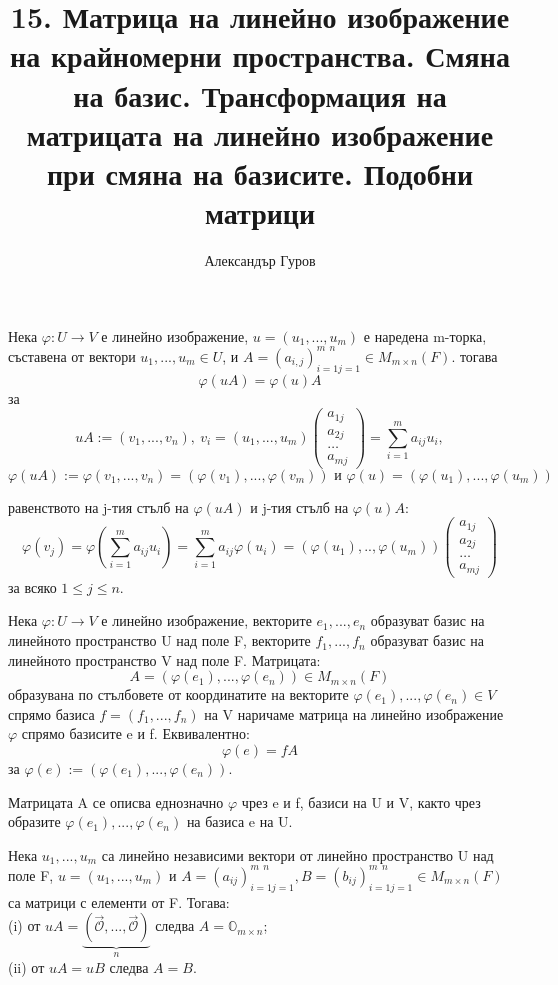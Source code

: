 \documentclass{article}
\title{15. Матрица на линейно изображение на крайномерни пространства. Смяна на базис. 
Трансформация на матрицата на линейно изображение при смяна на базисите. Подобни матрици}
\author{Александър Гуров}
\date{\datebulgarian{\today}}
\newcommand*{\nullvec}{\vec{\mathcal{O}}}
\newcommand{\dok}{\underline{Доказателство}\  }
\newcommand{\tvurdenie}[2]{
    \begin{tcolorbox}[title = #1 ,colframe = blue!70!black, colback = blue!10!white]
        #2
    \end{tcolorbox}
}
\newcommand{\opredelenie}[2]{
    \begin{tcolorbox}[title = #1 ,colframe = red!70!black, colback = red!10!white]
        #2
    \end{tcolorbox}
}
\begin{document}
\maketitle

\tvurdenie{Лема 15.2 (\emph{Матричен запис на линейно изображение})}{
Нека $\varphi : U \rightarrow V$ е линейно изображение, $u=(u_1,...,u_m)$ е наредена m-торка, съставена от вектори $u_1,...,u_m\in U$, и
$A=(a_{i,j})_{i=1j=1}^{m \ \ n} \in M_{m\times n}(F)$. тогава
\[
    \varphi(uA)=\varphi(u)A
\]
за
\[
    uA:=(v_1,...,v_n), \ v_i=(u_1,...,u_m)\left(\begin{array}{c}
            a_{1j} \\
            a_{2j} \\
            \dots  \\
            a_{mj}
        \end{array}\right)=\sum_{i=1}^{m}a_{ij}u_i,
\]
\[
    \varphi(uA):=\varphi(v_1,...,v_n)=(\varphi(v_1),...,\varphi(v_m)) \text{ и } \varphi(u)=(\varphi(u_1),...,\varphi(u_m))
\]
}
 равенството на j-тия стълб на $\varphi(uA)$ и j-тия стълб на $\varphi(u)A$:
\[
    \varphi(v_j)=\varphi\left(\sum_{i=1}^{m}a_{ij}u_i\right)=\sum_{i=1}^{m}a_{ij}\varphi(u_i)=(\varphi(u_1),..,\varphi(u_m))\left(\begin{array}{c}
            a_{1j} \\
            a_{2j} \\
            \dots  \\
            a_{mj}
        \end{array}\right)
\]
за всяко $1\leq j\leq n$.
\opredelenie{Определение 15.2}{
Нека $\varphi: U\rightarrow V$ е линейно изображение, векторите $e_1,...,e_n$ образуват базис на
линейното пространство U над поле F, векторите $f_1,...,f_n$ образуват базис на линейното
пространство V над поле F. Матрицата:
\[
    A=(\varphi(e_1),...,\varphi(e_n))\in M_{m\times n}(F)
\]
образувана по стълбовете от координатите на векторите $\varphi(e_1),...,\varphi(e_n)\in V$ спрямо базиса $f=(f_1,...,f_n)$ на V
наричаме матрица на линейно изображение $\varphi$ спрямо базисите e и f. Еквивалентно:
\[
    \varphi(e)=fA
\]
за $\varphi(e):=(\varphi(e_1),...,\varphi(e_n) )$.
}

Матрицата A се описва еднозначно $\varphi$ чрез e и f, базиси на U и V, както чрез образите $\varphi(e_1),...,\varphi(e_n)$ на базиса e на U.

\tvurdenie{Лема 15.4  (\emph{Матрична форма на линейната независимост на вектори})}{
Нека $u_1,...,u_m$ са линейно независими вектори от линейно пространство U над поле F, $u = (u_1,..., u_m) \text{ и } A = (a_{ij})_{i=1j=1}^{m \ \ n}, B = (b_{ij})_{i=1j=1}^{m \ \ n} \in M_{m\times n}(F)$
са матрици с елементи от F. Тогава:\\
(i) от $uA = \underbrace{(\nullvec,...,\nullvec)}_{n}$ следва $A = \mathbb{O}_{m\times n}$;\\
(ii) от $uA = uB$ следва $A = B$.
}
\end{document}
